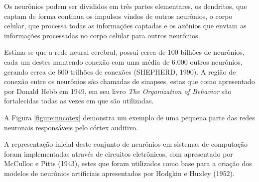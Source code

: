 \par Os neurônios podem ser divididos em três partes elementares, os dendritos, que captam de forma continua os impulsos vindos de outros neurônios, o corpo celular, que processa todas as informações captadas e os axônios que enviam as informações processadas no corpo celular para outros neurônios.


\par Estima-se que a rede neural cerebral, possui cerca de 100 bilhões de neurônios, cada um destes mantendo conexão com uma média de 6.000 outros neurônios, gerando cerca de 600 trilhões de conexões (SHEPHERD, 1990). A região de conexão entre os neurônios são chamadas de sinapses, estas que como apresentado por Donald Hebb em 1949, em seu livro \textit{The Organization of Behavior} são fortalecidas todas as vezes em que são utilizadas.


\par A Figura \ref{figure:nncotex} demonstra um exemplo de uma pequena parte das redes neuronais responsáveis pelo córtex auditivo.



\par A representação inicial deste conjunto de neurônios em sistemas de computação foram implementadas através de circuitos eletrônicos, com apresentado por McCulloc e Pitts (1943), estes que foram utilizados como base para a criação dos modelos de neurônios artificiais apresentados por Hodgkin e Huxley (1952).

